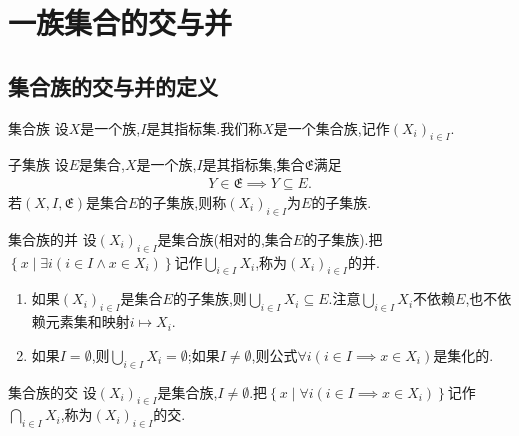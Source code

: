 \chapter{一族集合的交与并}

\section{集合族的交与并的定义}

\begin{definition}{集合族}{}
	设$X$是一个族,$I$是其指标集.我们称$X$是一个集合族,记作$\left(X_{i}\right)_{i\in I}$.
\end{definition}

\begin{definition}{子集族}{}
	设$E$是集合,$X$是一个族,$I$是其指标集,集合$\mathfrak{E}$满足
	\begin{align*}
		Y\in\mathfrak{E}\implies Y\subseteq E.
	\end{align*}
	若$\left(X,I,\mathfrak{E}\right)$是集合$E$的子集族,则称$\left(X_{i}\right)_{i\in I}$为$E$的子集族.
\end{definition}

\begin{definition}{集合族的并}{}
	设$\left(X_{i}\right)_{i\in I}$是集合族(相对的,集合$E$的子集族).把$\left\{x\middle|\exists i\left(i\in I\wedge x\in X_{i}\right)\right\}$记作$\bigcup\limits_{i\in I}X_{i}$,称为$\left(X_{i}\right)_{i\in I}$的并.
\end{definition}

\begin{remark}{}{}
	\begin{enumerate}
		\item 如果$\left(X_{i}\right)_{i\in I}$是集合$E$的子集族,则$\bigcup\limits_{i\in I}X_{i}\subseteq E$.注意$\bigcup\limits_{i\in I}X_{i}$不依赖$E$,也不依赖元素集和映射$i\mapsto X_{i}$.
		\item 如果$I=\emptyset$,则$\bigcup\limits_{i\in I}X_{i}=\emptyset$;如果$I\neq\emptyset$,则公式$\forall i\left(i\in I\implies x\in X_{i}\right)$是集化的.
	\end{enumerate}
\end{remark}

\begin{definition}{集合族的交}{}
	设$\left(X_{i}\right)_{i\in I}$是集合族,$I\neq\emptyset$.把$\left\{x\middle|\forall i\left(i\in I\implies x\in X_{i}\right)\right\}$记作$\bigcap\limits_{i\in I}X_{i}$,称为$\left(X_{i}\right)_{i\in I}$的交.
\end{definition}

